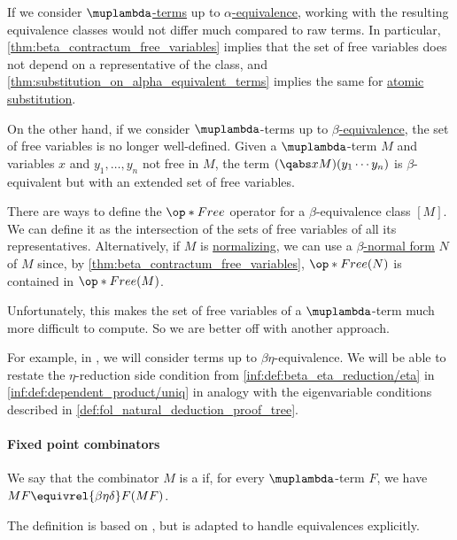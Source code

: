 \begin{remark}\label{rem:beta_equivalence_and_free_variables}
  If we consider \hyperref[def:lambda_term]{\( \muplambda \)-terms} up to \hyperref[def:lambda_term_alpha_equivalence]{\( \alpha \)-equivalence}, working with the resulting equivalence classes would not differ much compared to raw terms. In particular, \cref{thm:beta_contractum_free_variables} implies that the set of free variables does not depend on a representative of the class, and \cref{thm:substitution_on_alpha_equivalent_terms} implies the same for \hyperref[def:atomic_lambda_term_substitution]{atomic substitution}.

  On the other hand, if we consider \( \muplambda \)-terms up to \hyperref[def:beta_eta_reduction]{\( \beta \)-equivalence}, the set of free variables is no longer well-defined. Given a \( \muplambda \)-term \( M \) and variables \( x \) and \( y_1, \ldots, y_n \) not free in \( M \), the term \( (\qabs x M) (y_1 \cdots y_n) \) is \( \beta \)-equivalent but with an extended set of free variables.

  There are ways to define the \( \op*{Free} \) operator for a \( \beta \)-equivalence class \( [M] \). We can define it as the intersection of the sets of free variables of all its representatives. Alternatively, if \( M \) is \hyperref[def:lambda_term_normal_form]{normalizing}, we can use a \hyperref[def:lambda_term_normal_form]{\( \beta \)-normal form} \( N \) of \( M \) since, by \cref{thm:beta_contractum_free_variables}, \( \op*{Free}(N) \) is contained in \( \op*{Free}(M) \).

  Unfortunately, this makes the set of free variables of a \( \muplambda \)-term much more difficult to compute. So we are better off with another approach.

  For example, in , we will consider terms up to \( \beta\eta \)-equivalence. We will be able to restate the \( \eta \)-reduction side condition from \ref{inf:def:beta_eta_reduction/eta} in \ref{inf:def:dependent_product/uniq} in analogy with the eigenvariable conditions described in \cref{def:fol_natural_deduction_proof_tree}.
\end{remark}

\paragraph{Fixed point combinators}

\begin{definition}\label{def:function_fixed_point_combinator}\mimprovised
  We say that the combinator \( M \) is a  if, for every \( \muplambda \)-term \( F \), we have \( MF \equivrel{\beta\eta\delta} F(MF) \).
\end{definition}
\begin{comments}
  \item The definition is based on \cite[\S 6.1.2]{Barendregt1984LambdaCalculus}, but is adapted to handle equivalences explicitly.
\end{comments}

